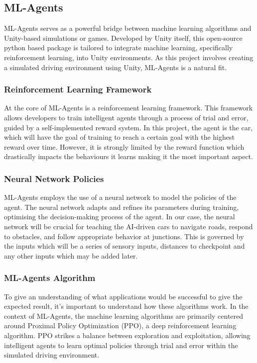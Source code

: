 \documentclass{article}
\begin{document}
\subsection{ML-Agents}
ML-Agents serves as a powerful bridge between machine learning algorithms and Unity-based simulations or games. Developed by Unity itself, this open-source python based package is tailored to integrate machine learning, specifically reinforcement learning, into Unity environments. As this project involves creating a simulated driving environment using Unity, ML-Agents is a natural fit.

\subsubsection{Reinforcement Learning Framework}
At the core of ML-Agents is a reinforcement learning framework. This framework allows developers to train intelligent agents through a process of trial and error, guided by a self-implemented reward system. In this project, the agent is the car, which will have the goal of training to reach a certain goal with the highest reward over time. However, it is strongly limited by the reward function which drastically impacts the behaviours it learns making it the most important aspect.

\subsubsection{Neural Network Policies}
ML-Agents employs the use of a neural network to model the policies of the agent. The neural network adapts and refines its parameters during training, optimising the decision-making process of the agent. In our case, the neural network will be crucial for teaching the AI-driven cars to navigate roads, respond to obstacles, and follow appropriate behavior at junctions. This is governed by the inputs which will be a series of sensory inputs, distances to checkpoint and any other inputs which may be added later.

\subsubsection{ML-Agents Algorithm}
To give an understanding of what applications would be successful to give the expected result, it's important to understand how these algorithms work. In the context of ML-Agents, the machine learning algorithms are primarily centered around Proximal Policy Optimization (PPO), a deep reinforcement learning algorithm. PPO strikes a balance between exploration and exploitation, allowing intelligent agents to learn optimal policies through trial and error within the simulated driving environment.\cite{PPO-MLAgents}\\
\end{document}
